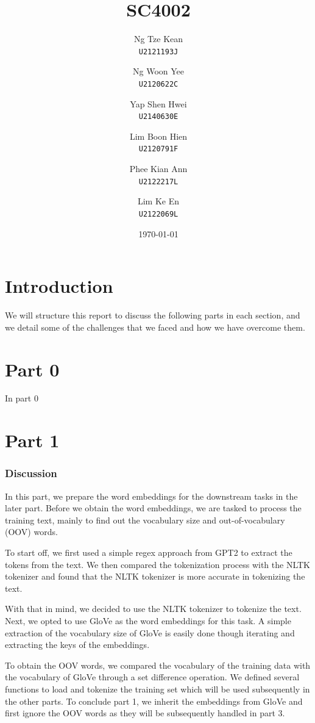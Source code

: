 \documentclass{article}
\title{SC4002}
\author{
  Ng Tze Kean\\
  \texttt{U2121193J} \and
  Ng Woon Yee\\
  \texttt{U2120622C} \and
  Yap Shen Hwei\\
  \texttt{U2140630E} \and
  Lim Boon Hien\\
  \texttt{U2120791F} \and
  Phee Kian Ann\\
  \texttt{U2122217L} \and
  Lim Ke En\\
  \texttt{U2122069L}
}
\date{\today}
\begin{document}
\maketitle

\section*{Introduction}
We will structure this report to discuss the following parts in each section,
and we detail some of the challenges that we faced and how we have overcome
them.

\section*{Part 0}

In part 0

\section*{Part 1}

\subsubsection*{Discussion}

In this part, we prepare the word embeddings for the downstream tasks in the
later part. Before we obtain the word embeddings, we are tasked to process the
training text, mainly to find out the vocabulary size and out-of-vocabulary
(OOV) words.

To start off, we first used a simple regex approach from GPT2 to extract the
tokens from the text. We then compared the tokenization process with the NLTK
tokenizer and found that the NLTK tokenizer is more accurate in tokenizing the
text.


With that in mind, we decided to use the NLTK tokenizer to tokenize the text.
Next, we opted to use GloVe as the word embeddings for this task. A simple
extraction of the vocabulary size of GloVe is easily done though iterating and
extracting the keys of the embeddings.

To obtain the OOV words, we compared the vocabulary of the training data with
the vocabulary of GloVe through a set difference operation. We defined several
functions to load and tokenize the training set which will be used subsequently
in the other parts. To conclude part 1, we inherit the embeddings from GloVe
and first ignore the OOV words as they will be subsequently handled in part 3.
\end{document}

